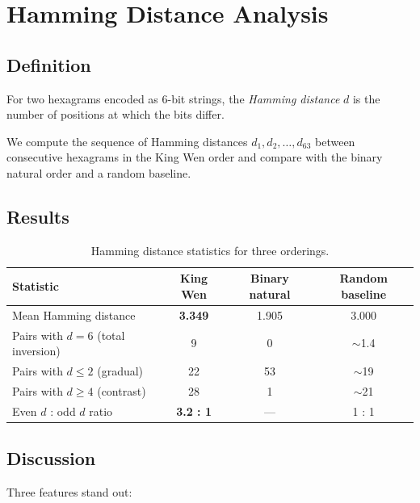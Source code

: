 \documentclass[11pt,a4paper]{article}
\begin{document}
\section{Hamming Distance Analysis}\label{sec:hamming}

\subsection{Definition}

For two hexagrams encoded as 6-bit strings, the \emph{Hamming distance} $d$ is the number of positions at which the bits differ.

We compute the sequence of Hamming distances $d_1, d_2, \ldots, d_{63}$ between consecutive hexagrams in the King Wen order and compare with the binary natural order and a random baseline.

\subsection{Results}

\begin{table}[ht]
\centering
\caption{Hamming distance statistics for three orderings.}
\label{tab:hamming}
\begin{tabular}{@{}lccc@{}}
\toprule
Statistic & King Wen & Binary natural & Random baseline \\
\midrule
Mean Hamming distance & \textbf{3.349} & 1.905 & 3.000 \\
Pairs with $d=6$ (total inversion) & 9 & 0 & $\sim$1.4 \\
Pairs with $d \leq 2$ (gradual) & 22 & 53 & $\sim$19 \\
Pairs with $d \geq 4$ (contrast) & 28 & 1 & $\sim$21 \\
Even $d$ : odd $d$ ratio & \textbf{3.2 : 1} & --- & 1 : 1 \\
\bottomrule
\end{tabular}
\end{table}

\subsection{Discussion}

Three features stand out:
\end{document}
